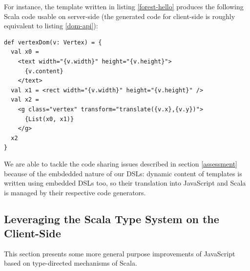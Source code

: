 \documentclass[american,english,runningheads]{llncs}
\begin{document}
For instance, the template written in listing \ref{forest-hello} produces the following Scala code usable on
server-side (the generated code for client-side is roughly equivalent to listing \ref{dom-api}):

\begin{lstlisting}
def vertexDom(v: Vertex) = {
  val x0 =
    <text width="{v.width}" height="{v.height}">
      {v.content}
    </text>
  val x1 = <rect width="{v.width}" height="{v.height}" />
  val x2 =
    <g class="vertex" transform="translate({v.x},{v.y})">
      {List(x0, x1)}
    </g>
  x2
}
\end{lstlisting}

We are able to tackle the code sharing issues described in section \ref{assessment} because of the embdedded nature
of our DSLs: dynamic content of templates is written using embedded DSLs too, so their translation into JavaScript
and Scala is managed by their respective code generators.

\subsection{Leveraging the Scala Type System on the Client-Side}

This section presents some more general purpose improvements of JavaScript based on type-directed mechanisms of
Scala.
\end{document}
